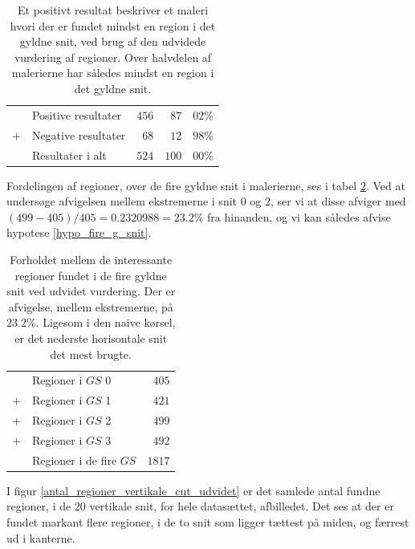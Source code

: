 {\begin{table}[H]
    \centering
    \begin{tabular}{r@{\ \ }p{12em}r|r@{.}l}
            & Positive resultater   & $456$ &  $87$ & $02\%$ \\
        $+$ & Negative resultater   &  $68$ &  $12$ & $98\%$ \\\hline
            & Resultater i alt      & $524$ & $100$ & $00\%$
    \end{tabular}
    \caption[]{Et positivt resultat beskriver et maleri hvori der er
    fundet mindst en region i det gyldne snit, ved brug af den udvidede
    vurdering af regioner. Over halvdelen af malerierne har således
    mindst en region i det gyldne snit.}
    \label{ud_tabel_fordeling}
\end{table}

Fordelingen af regioner, over de fire gyldne snit i malerierne, ses i
tabel \ref{ud_tabel_fire_snit}. Ved at undersøge afvigelsen mellem
ekstremerne i snit 0 og 2, ser vi at disse afviger med $(499 -
405)/405 = 0.2320988 = 23.2 \%$ fra hinanden, og vi kan således afvise
hypotese \ref{hypo_fire_g_snit}.

\begin{table}[H]
    \centering
    \begin{tabular}{r@{\ \ }p{12em}r}
            & Regioner i $GS$ 0         &  $405$ \\
        $+$ & Regioner i $GS$ 1         &  $421$ \\
        $+$ & Regioner i $GS$ 2         &  $499$ \\
        $+$ & Regioner i $GS$ 3         &  $492$ \\\hline
            & Regioner i de fire $GS$   & $1817$
    \end{tabular}
    \caption[]{Forholdet mellem de interessante regioner fundet i de
    fire gyldne snit ved udvidet vurdering. Der er afvigelse, mellem
    ekstremerne, på $23.2 \%$. Ligesom i den naive kørsel, er det
    nederste horisontale snit det mest brugte.}
    \label{ud_tabel_fire_snit}
\end{table}


I figur \ref{antal_regioner_vertikale_cut_udvidet} er det samlede antal
fundne regioner, i de 20 vertikale snit, for hele datasættet,
afbilledet. Det ses at der er fundet markant flere regioner, i de to snit som
ligger tættest på miden, og færrest ud i kanterne.

}
